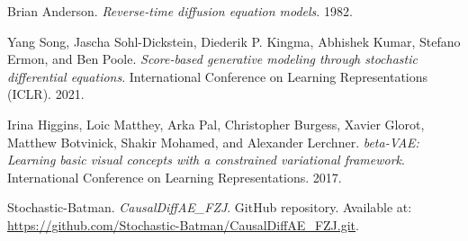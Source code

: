 \documentclass{article}
\begin{document}
\begin{thebibliography}{9}
	Brian Anderson. 
	\textit{Reverse-time diffusion equation models}.
	1982.
	
	Yang Song, Jascha Sohl-Dickstein, Diederik P. Kingma, Abhishek Kumar, Stefano Ermon, and Ben Poole. 
	\textit{Score-based generative modeling through stochastic differential equations}. 
	International Conference on Learning Representations (ICLR).
	2021.
	
	Irina Higgins, Loic Matthey, Arka Pal, Christopher Burgess, Xavier Glorot, Matthew Botvinick, Shakir Mohamed, and Alexander Lerchner. \textit{beta-VAE: Learning basic visual concepts with a constrained variational framework}. 
	International Conference on Learning Representations.
	2017.
	
	Stochastic-Batman. \textit{CausalDiffAE\_FZJ}. GitHub repository. Available at: \url{https://github.com/Stochastic-Batman/CausalDiffAE_FZJ.git}.
	
	\end{thebibliography}
\end{document}
